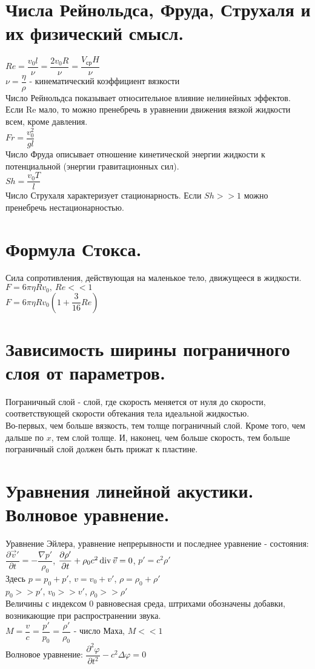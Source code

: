 \begin{multicols*}{2}
		\section{Числа Рейнольдса, Фруда, Струхаля и их физический смысл.}
		$Re=\dfrac{v_0l}{\nu}=\dfrac{2v_0R}{\nu} = \dfrac{V_\text{ср}H}{\nu}$\\
		$\nu=\dfrac{\eta}{\rho}$ - кинематический коэффициент вязкости \\
		Число Рейнольдса показывает относительное влияние нелинейных эффектов. Если Re мало, то можно пренебречь в уравнении движения вязкой жидкости всем, кроме давления. \\
		$Fr=\dfrac{v_0^2}{gl}$ \\
		Число Фруда описывает отношение кинетической энергии жидкости к потенциальной (энергии гравитационных сил). \\
		$Sh=\dfrac{v_0T}{l}$ \\
		Число Струхаля характеризует стационарность. Если $Sh >> 1$ можно пренебречь нестационарностью.
		
		\section{Формула Стокса.}
		Сила сопротивления, действующая на маленькое тело, движущееся в жидкости.\\
		$F=6\pi\eta Rv_0, ~Re << 1$ \\
		$F=6\pi\eta Rv_0\left(1+\dfrac{3}{16}Re\right)$
		
		\section{Зависимость ширины пограничного слоя от параметров.}
		Пограничный слой - слой, где скорость меняется от нуля до скорости, соответствующей скорости обтекания тела идеальной жидкостью.\\
		Во-первых, чем больше вязкость, тем толще пограничный слой. Кроме того, чем дальше по $x$, тем слой толще. И, наконец, чем больше скорость, тем больше пограничный слой должен быть прижат к пластине.
		
		\section{Уравнения линейной акустики. Волновое уравнение.}
		Уравнение Эйлера, уравнение непрерывности и последнее уравнение - состояния:\\
		$\dfrac{\partial \vec{v}'}{\partial t} = -\dfrac{\nabla p'}{\rho_0}$,	$\dfrac{\partial \rho'}{\partial t} + \rho_0 c^2 \operatorname{div} \vec{v} = 0$, 	$p' = c^2 \rho'$\\
		Здесь $p = p_0 + p'$, $v = v_0 + v'$, $\rho  = \rho_0 + \rho'$\\
		$p_0 >> p'$, $v_0 >> v'$, $\rho_0 >> \rho'$\\
		Величины с индексом 0 равновесная среда, штрихами обозначены добавки, возникающие при распространении звука.\\
		$M = \dfrac{v}{c} = \dfrac{p'}{p_0} = \dfrac{\rho'}{\rho_0}$ - число Маха, $M << 1$\\
		Волновое уравнение:
		$\dfrac{\partial^2 \varphi}{\partial t^2} - c^2 \Delta\varphi = 0$
		

\end{multicols*}
